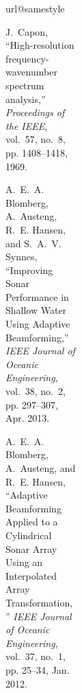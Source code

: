\begin{figure}[tbp]
\begin{figure}[tbp]
\begin{figure}[t]
\begin{figure}[tbp]
\begin{figure}[tb]
\ifCLASSOPTIONcaptionsoff
  \newpage
\fi

\ifPhdDoc
\let\thesection\oldthesection
\let\thesubsection\oldthesubsection
{}
   \printbibliography[title=References,heading=subbibliography]
%    
\else
{}
   \ifBuildBibliography
      
      

   \else

      \begin{thebibliography}{10}
      \providecommand{\url}[1]{#1}
      \csname url@samestyle\endcsname
      \providecommand{\newblock}{\relax}
      \providecommand{\bibinfo}[2]{#2}
      \providecommand{\BIBentrySTDinterwordspacing}{\spaceskip=0pt\relax}
      \providecommand{\BIBentryALTinterwordstretchfactor}{4}
      \providecommand{\BIBentryALTinterwordspacing}{\spaceskip=\fontdimen2\font plus
      \BIBentryALTinterwordstretchfactor\fontdimen3\font minus
      \fontdimen4\font\relax}
      \providecommand{\BIBforeignlanguage}[2]{{%
      \expandafter\ifx\csname l@#1\endcsname\relax
      \typeout{** WARNING: IEEEtran.bst: No hyphenation pattern has been}%
      \typeout{** loaded for the language `#1'. Using the pattern for}%
      \typeout{** the default language instead.}%
      \else
      \language=\csname l@#1\endcsname
      \fi
      #2}}
      \providecommand{\BIBdecl}{\relax}
      \BIBdecl

      J.~Capon, ``{High-resolution frequency-wavenumber spectrum analysis},''
      \emph{Proceedings of the IEEE}, vol.~57, no.~8, pp. 1408--1418, 1969.

      A.~E.~A. Blomberg, A.~Austeng, R.~E. Hansen, and S.~A.~V. Synnes, ``{Improving
      Sonar Performance in Shallow Water Using Adaptive Beamforming},'' \emph{IEEE
      Journal of Oceanic Engineering}, vol.~38, no.~2, pp. 297--307, Apr. 2013.

      A.~E.~A. Blomberg, A.~Austeng, and R.~E. Hansen, ``{Adaptive Beamforming
      Applied to a Cylindrical Sonar Array Using an Interpolated Array
      Transformation},'' \emph{IEEE Journal of Oceanic Engineering}, vol.~37,
      no.~1, pp. 25--34, Jan. 2012.


\end{thebibliography}
\end{figure}
\end{figure}
\end{figure}
\end{figure}
\end{figure}
